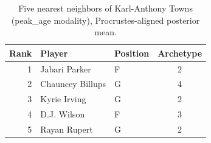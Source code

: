 \begin{table}[htbp]
  \centering\small
  \begin{tabular}{rllc}
    \toprule
    Rank & Player & Position & Archetype \\
    \midrule
    1 & Jabari Parker & F & 2 \\
    2 & Chauncey Billups & G & 4 \\
    3 & Kyrie Irving & G & 2 \\
    4 & D.J. Wilson & F & 3 \\
    5 & Rayan Rupert & G & 2 \\
    \bottomrule
  \end{tabular}
  \caption{Five nearest neighbors of Karl-Anthony Towns (peak_age modality), Procrustes-aligned posterior mean.}
  \label{tab:Karl_Anthony_Towns_neighbors_peak_age}
\end{table}

